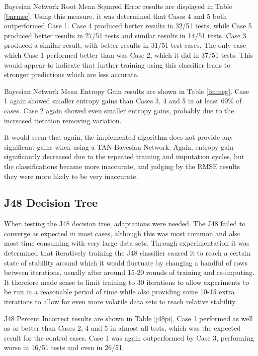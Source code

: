 Bayesian Network Root Mean Squared Error results are displayed in Table \ref{bnrmse}. Using this measure, it was determined that Cases 4 and 5 both outperformed Case 1. Case 4 produced better results in 32/51 tests, while Case 5 produced better results in 27/51 tests and similar results in 14/51 tests. Case 3 produced a similar result, with better results in 31/51 test cases. The only case which Case 1 performed better than was Case 2, which it did in 37/51 tests. This would appear to indicate that further training using this classifier leads to stronger predictions which are less accurate.

Bayesian Network Mean Entropy Gain results are shown in Table \ref{bnmeg}. Case 1 again showed smaller entropy gains than Cases 3, 4 and 5 in at least 60\% of cases. Case 2 again showed even smaller entropy gains, probably due to the increased iteration removing variation.

It would seem that again, the implemented algorithm does not provide any significant gains when using a TAN Bayesian Network. Again, entropy gain significantly decreased due to the repeated training and imputation cycles, but the classifications became more inaccurate, and judging by the RMSE results they were more likely to be very inaccurate.

\subsection{J48 Decision Tree}\label{j48experiments}
When testing the J48 decision tree, adaptations were needed. The J48 failed to converge as expected in most cases, although this was most common and also most time consuming with very large data sets. Through experimentation it was determined that iteratively training the J48 classifier caused it to reach a certain state of stability around which it would fluctuate by changing a handful of rows between iterations, usually after around 15-20 rounds of training and re-imputing. It therefore made sense to limit training to 30 iterations to allow experiments to be run in a reasonable period of time while also providing some 10-15 extra iterations to allow for even more volatile data sets to reach relative stability.

J48 Percent Incorrect results are shown in Table \ref{j48pi}. Case 1 performed as well as or better than Cases 2, 4 and 5 in almost all tests, which was the expected result for the control cases. Case 1 was again outperformed by Case 3, performing worse in 16/51 tests and even in 26/51. 

